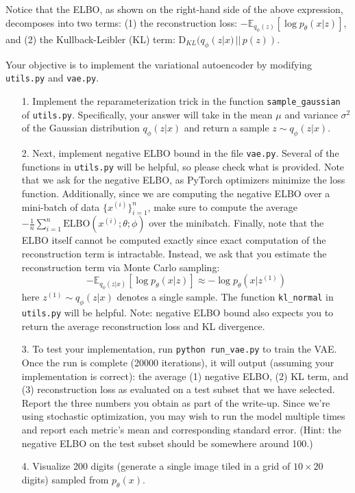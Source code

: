 \documentclass[a4paper]{article}
\theoremstyle{definition}
\begin{document}
Notice that the ELBO, as shown on the right-hand side of the above expression, decomposes into two terms: (1) the reconstruction loss: $-\mathbb{E}_{q_\phi(z)}[\log p_\theta(x|z)]$, and (2) the Kullback-Leibler (KL) term: $\text{D}_{KL}(q_\phi(z|x) \,||\, p(z))$.\linebreak

Your objective is to implement the variational autoencoder by modifying \texttt{utils.py} and \texttt{vae.py}.

\begin{enumerate}
    \item [1.] Implement the reparameterization trick in the function \texttt{sample\_gaussian} of \texttt{utils.py}. Specifically, your answer will take in the mean $\mu$ and variance $\sigma^2$ of the Gaussian distribution $q_\phi(z|x)$ and return a sample $z \sim q_\phi(z|x)$.
    \item [2.] Next, implement negative ELBO bound in the file \texttt{vae.py}. Several of the functions in \texttt{utils.py} will be helpful, so please check what is provided. Note that we ask for the negative ELBO, as PyTorch optimizers minimize the loss function. Additionally, since we are computing the negative ELBO over a mini-batch of data $\{x^{(i)}\}_{i=1}^n$, make sure to compute the average $-\frac{1}{n} \sum_{i=1}^n \text{ELBO}(x^{(i)}; \theta; \phi)$ over the minibatch. Finally, note that the ELBO itself cannot be computed exactly since exact computation of the reconstruction term is intractable. Instead, we ask that you estimate the reconstruction term via Monte Carlo sampling:
    \[
    -\mathbb{E}_{q_\phi(z|x)}[\log p_\theta(x|z)] \approx -\log p_\theta(x|z^{(1)})
    \]
    here $z^{(1)} \sim q_\phi(z|x)$ denotes a single sample. The function \texttt{kl\_normal} in \texttt{utils.py} will be helpful. Note: negative ELBO bound also expects you to return the average reconstruction loss and KL divergence.
    
    \item [3.] To test your implementation, run \texttt{python run\_vae.py} to train the VAE. Once the run is complete (20000 iterations), it will output (assuming your implementation is correct): the average (1) negative ELBO, (2) KL term, and (3) reconstruction loss as evaluated on a test subset that we have selected. Report the three numbers you obtain as part of the write-up. Since we’re using stochastic optimization, you may wish to run the model multiple times and report each metric’s mean and corresponding standard error. (Hint: the negative ELBO on the test subset should be somewhere around 100.)
    
    \item [4.]  Visualize 200 digits (generate a single image tiled in a grid of $10 \times 20$ digits) sampled from $p_\theta(x)$.
\end{enumerate}





\end{document}
